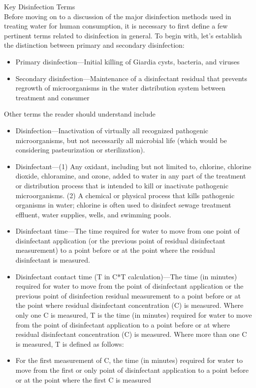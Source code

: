 \documentclass{article}
\begin{document}
Key Disinfection Terms\\
Before moving on to a discussion of the major disinfection methods used in treating water for human consumption, it is necessary to first define a few pertinent terms related to disinfection in general. To begin with, let’s establish the distinction between primary and secondary disinfection:
\begin{itemize}
\item Primary disinfection—Initial killing of Giardia cysts, bacteria, and viruses
\item Secondary disinfection—Maintenance of a disinfectant residual that prevents regrowth of microorganisms in the water distribution system between treatment and consumer
\end{itemize}
Other terms the reader should understand include
\begin{itemize}
\item Disinfection—Inactivation of virtually all recognized pathogenic microorganisms, but not necessarily all microbial life (which would be considering pasteurization or sterilization).
\item Disinfectant—(1) Any oxidant, including but not limited to, chlorine, chlorine dioxide, chloramine, and ozone, added to water in any part of the treatment or distribution process that is intended to kill or inactivate pathogenic microorganisms. (2) A chemical or physical process that kills pathogenic organisms in water; chlorine is often used to disinfect sewage treatment effluent, water supplies, wells, and swimming pools.
\item Disinfectant time—The time required for water to move from one point of disinfectant application (or the previous point of residual disinfectant measurement) to a point before or at the point where the residual disinfectant is measured.
\item Disinfectant contact time (T in C*T calculation)—The time (in minutes) required for water to move from the point of disinfectant application or the previous point of disinfection residual measurement to a point before or at
the point where residual disinfectant concentration (C) is measured. Where only one C is measured, T is the time (in minutes) required for water to move from the point of disinfectant application to a point before or at where residual disinfectant concentration (C) is measured. Where more than one C is measured, T is defined as follows:
\item For the first measurement of C, the time (in minutes) required for water to move from the first or only point of disinfectant application to a point before or at the point where the first C is measured

\end{itemize}
\end{document}

